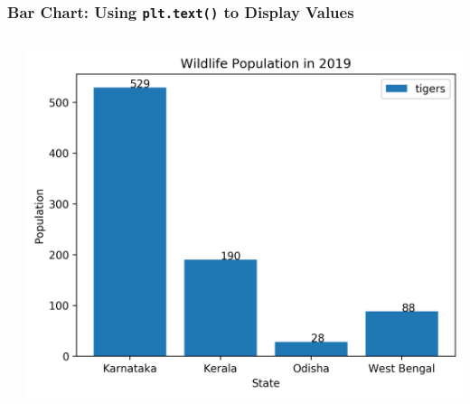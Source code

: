\documentclass[xcolor={svgnames}]{beamer}
\newcommand{\ttcode}[2][]{\lstinline[style=plain,basicstyle=\ttfamily#1]{#2}}
\newcommand{\pyfile}[2][]{}
\begin{document}
\begin{frame}[t,fragile]
    \frametitle{Bar Chart: Using \ttcode{plt.text()} to Display Values}
    \vspace{-2mm}
    \begin{columns}[T]
        \begin{column}{0.54\textwidth}
            \pyfile[style=footnotesize]{examples/17-bar-values-misaligned.py}
        \end{column}
        \begin{column}{0.46\textwidth}
            \includegraphics[width=\textwidth]{img/17-bar-values-misaligned.png}
        \end{column}
    \end{columns}
\end{frame}
\end{document}

